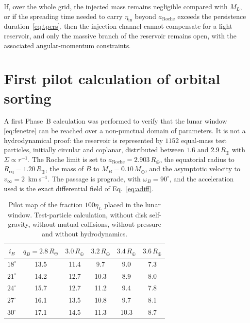 \documentclass[11pt,a4paper,openany]{report}
\newcommand{\Mt}{M_{\oplus}}
\newcommand{\Rt}{R_{\oplus}}
\newcommand{\Req}{R_{\mathrm{eq}}}
\newcommand{\aR}{a_{\mathrm{Roche}}}
\begin{document}
\begin{falsif}
If, over the whole grid, the injected mass remains negligible compared with $M_L$, or if the
spreading time needed to carry $\eta_{\mathrm{in}}$ beyond $\aR$ exceeds the persistence
duration~\eqref{eq:tpers}, then the injection channel cannot compensate for a light reservoir, and
only the massive branch of the reservoir remains open, with the associated angular-momentum
constraints.
\end{falsif}

\section{First pilot calculation of orbital sorting}
\label{sec:pilot-etaL}

A first Phase~B calculation was performed to verify that the lunar window
\eqref{eq:fenetre} can be reached over a non-punctual domain of parameters. It is not a
hydrodynamical proof: the reservoir is represented by $1152$ equal-mass test particles,
initially circular and coplanar, distributed between $1.6$ and $2.9\,\Rt$ with
$\Sigma\propto r^{-1}$. The Roche limit is set to $a_{\mathrm{Roche}}=2.903\,\Rt$, the
equatorial radius to $\Req=1.20\,\Rt$, the mass of $B$ to $M_B=0.10\,\Mt$, and the
asymptotic velocity to $v_\infty=2$~km\,s$^{-1}$. The passage is prograde, with
$\omega_B=90^\circ$, and the acceleration used is the exact differential field of
Eq.~\eqref{eq:adiff}.

\begin{table}[htbp]
\centering
\small
\caption{Pilot map of the fraction $100\eta_L$ placed in the lunar window. Test-particle
calculation, without disk self-gravity, without mutual collisions, without pressure and without
hydrodynamics.}
\label{tab:pilot-etaL}
\begin{tabular}{c|ccccc}
\toprule
$i_B$ & $q_B=2.8\,\Rt$ & $3.0\,\Rt$ & $3.2\,\Rt$ & $3.4\,\Rt$ & $3.6\,\Rt$ \\
\midrule
$18^\circ$ & 13.5 & 11.4 & 9.7 & 9.0 & 7.3 \\
$21^\circ$ & 14.2 & 12.7 & 10.3 & 8.9 & 8.0 \\
$24^\circ$ & 15.7 & 12.7 & 11.2 & 9.4 & 7.8 \\
$27^\circ$ & 16.1 & 13.5 & 10.8 & 9.7 & 8.1 \\
$30^\circ$ & 17.1 & 14.5 & 11.3 & 10.3 & 8.7 \\
\bottomrule
\end{tabular}
\end{table}
\end{document}
